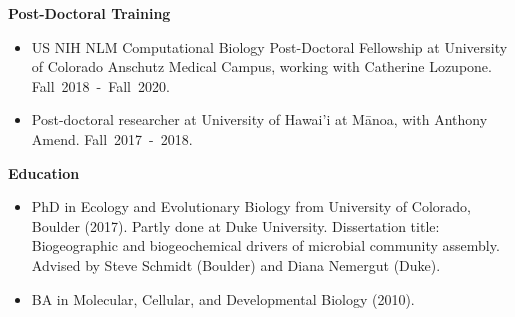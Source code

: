 \documentclass{article}
\begin{document}
\vspace{2mm}
%
{\large  \textbf{Post-Doctoral Training}}
\begin{adjustwidth}{5mm}{}
  \begin{itemize}[noitemsep,topsep=0pt, leftmargin=5mm]
    \item US NIH NLM Computational Biology Post-Doctoral Fellowship at University of Colorado Anschutz Medical Campus, working with Catherine Lozupone. \mbox{Fall 2018 - Fall 2020.}
    \item Post-doctoral researcher at University of Hawai'i at Mānoa, with Anthony Amend. \mbox{Fall 2017 - 2018.}
  \end{itemize}
\end{adjustwidth}
%
\vspace{2mm}
{\large  \textbf{Education}}
\begin{adjustwidth}{5mm}{}
  \begin{itemize}[noitemsep,topsep=0pt, leftmargin=5mm]
    \item PhD in Ecology and Evolutionary Biology from University of Colorado, Boulder (2017). Partly done at Duke University. Dissertation title: Biogeographic and biogeochemical drivers of microbial community assembly. Advised by Steve Schmidt (Boulder) and Diana Nemergut (Duke). 
    \item BA in Molecular, Cellular, and Developmental Biology (2010).
  \end{itemize}
\end{adjustwidth}
\end{document}
